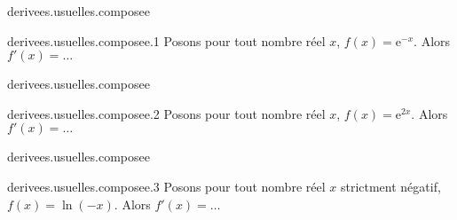 \begin{qcm}{derivees.usuelles.composee}
    \begin{question}{derivees.usuelles.composee.1}
         Posons pour tout nombre réel \(x\), \( f(x)=\mathrm{e}^{-x} \). Alors \( f'(x)=\ldots\)
         \begin{multicols}{3}     
	    \begin{reponses}
            \lastchoices
  		 
             \phantom{foo}
          \end{reponses}
         \end{multicols}
    \end{question}
\end{qcm}

\begin{qcm}{derivees.usuelles.composee}
    \begin{question}{derivees.usuelles.composee.2}
         Posons pour tout nombre réel \(x\), \( f(x)=\mathrm{e}^{2x} \). Alors \( f'(x)=\ldots\)
         \begin{multicols}{3}     
	    \begin{reponses}
              \lastchoices
  		 
  		 \phantom{foo}
	    \end{reponses}
         \end{multicols}
    \end{question}
\end{qcm}

\begin{qcm}{derivees.usuelles.composee}
    \begin{question}{derivees.usuelles.composee.3}
         Posons pour tout nombre réel \(x\) strictment négatif, \( f(x)= \ln(-x) \). Alors \( f'(x)=\ldots\)
         \begin{multicols}{3}     
	    \begin{reponses}
		 \bonne{\( \dfrac{1}{x}  \)}
	      \mauvaise{\(\mathrm{e}^{-x} \textcolor{white}{\dfrac{e^a}{b}}\)}
	      \mauvaise{\(-\mathrm{e}^{-x}\textcolor{white}{\dfrac{e^a}{b}}\)}
  		 \lastchoices
  		 
  		 \phantom{foo}
	    \end{reponses}
         \end{multicols}
    \end{question}
\end{qcm}

